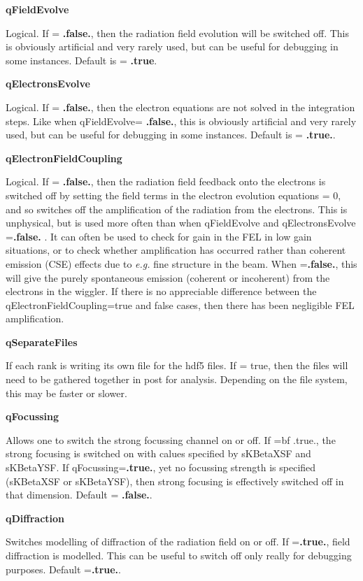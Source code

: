 \documentclass[12pt]{article}%
\begin{document}
{\bf qFieldEvolve}

Logical. If = {\bf .false.}, then the radiation field evolution will be switched off. This is obviously artificial and very rarely used, but can be useful for debugging in some instances. Default is = {\bf .true}.

{\bf qElectronsEvolve}

Logical. If = {\bf .false.}, then the electron equations are not solved in the integration steps. Like when qFieldEvolve= {\bf .false.},  this is obviously artificial and very rarely used, but can be useful for debugging in some instances. Default is = {\bf .true.}.

{\bf qElectronFieldCoupling}

Logical. If = {\bf .false.}, then the radiation field feedback onto the electrons is switched off by setting the field terms in the electron evolution equations = 0, and so switches off the amplification of the radiation from the electrons. This is unphysical, but is used more often than when qFieldEvolve and qElectronsEvolve ={\bf .false.} . It can often be used to check for gain in the FEL in low gain situations, or to check whether amplification has occurred rather than coherent emission (CSE) effects due to \textit{e.g.} fine structure in the beam. When ={\bf .false.}, this will give the purely spontaneous emission (coherent or incoherent) from the electrons in the wiggler. If there is no appreciable difference between the qElectronFieldCoupling=true and false cases, then there has been negligible FEL amplification.

{\bf qSeparateFiles}

If each rank is writing its own file for the hdf5 files. If = true, then the files will need to be gathered together in post for analysis. Depending on the file system, this may be faster or slower.

{\bf qFocussing}

Allows one to switch the strong focussing channel on or off. If ={bf .true.}, the strong focusing is switched on with calues specified by sKBetaXSF and sKBetaYSF. If qFocussing={\bf .true.}, yet no focussing strength is specified (sKBetaXSF or sKBetaYSF), then strong focusing is effectively switched off in that dimension. Default = {\bf .false.}.

{\bf qDiffraction}

Switches modelling of diffraction of the radiation field on or off. If ={\bf .true.}, field diffraction is modelled. This can be useful to switch off only really for debugging purposes. Default ={\bf .true.}.
\end{document}
